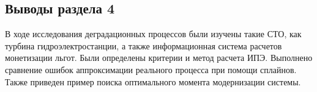 \subsection*{Выводы раздела 4}
В ходе исследования деградационных процессов были изучены такие СТО, как турбина гидроэлектростанции,
а также информационная система расчетов монетизации льгот.
Были определены критерии и метод расчета ИПЭ. 
Выполнено сравнение ошибок аппроксимации реального процесса при помощи сплайнов.
Также приведен пример поиска оптимального момента модернизации системы.







